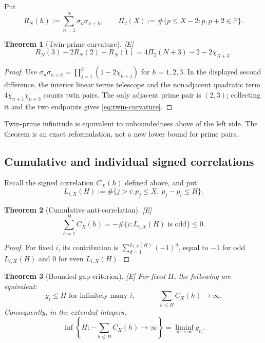 \documentclass[11pt]{article}
\newtheorem{theorem}{Theorem}[section]
\theoremstyle{definition}
\theoremstyle{remark}
\newcommand{\PP}{\mathbb P}
\newcommand{\status}[1]{\textnormal{\textcolor{accent}{\footnotesize[#1]}}}
\begin{document}
Put
\[
 R_N(h):=\sum_{n=1}^{N}\sigma_n\sigma_{n+h},
 \qquad
 \Pi_2(X):=\#\{p\le X-2:p,p+2\in\PP\}.
\]

\begin{theorem}[Twin-prime curvature]\label{thm:twin-curvature}
\status{E}
\begin{equation}\label{eq:twin-curvature}
 R_N(3)-2R_N(2)+R_N(1)
 =4\Pi_2(N+3)-2-2\chi_{N+3}.
\end{equation}
\end{theorem}

\begin{proof}
Use
$\sigma_n\sigma_{n+h}=\prod_{j=1}^{h}(1-2\chi_{n+j})$ for $h=1,2,3$.
In the displayed second difference, the interior linear terms telescope and the
nonadjacent quadratic term $4\chi_{n+1}\chi_{n+3}$ counts twin pairs.  The only adjacent
prime pair is $(2,3)$; collecting it and the two endpoints gives
\eqref{eq:twin-curvature}.
\end{proof}

Twin-prime infinitude is equivalent to unboundedness above of the left side.  The theorem
is an exact reformulation, not a new lower bound for prime pairs.

\subsection{Cumulative and individual signed correlations}

Recall the signed correlation $C_X(h)$ defined above, and put
\[
 L_{i,X}(H):=\#\{j>i:p_j\le X,\ p_j-p_i\le H\}.
\]

\begin{theorem}[Cumulative anti-correlation]\label{thm:cumulative-anti}
\status{E}
\begin{equation}\label{eq:cumulative-anti}
 \sum_{h=1}^{H}C_X(h)
 =-\#\{i:L_{i,X}(H)\text{ is odd}\}\le0.
\end{equation}
\end{theorem}

\begin{proof}
For fixed $i$, its contribution is
$\sum_{d=1}^{L_{i,X}(H)}(-1)^d$, equal to $-1$ for odd $L_{i,X}(H)$ and $0$ for even
$L_{i,X}(H)$.
\end{proof}

\begin{theorem}[Bounded-gap criterion]\label{thm:bounded-gap-criterion}
\status{E}
For fixed $H$, the following are equivalent:
\[
 g_i\le H\text{ for infinitely many }i,
 \qquad
 -\sum_{h\le H}C_X(h)\longrightarrow\infty.
\]
Consequently, in the extended integers,
\begin{equation}\label{eq:Hanti}
 \inf\left\{H:-\sum_{h\le H}C_X(h)\to\infty\right\}
 =\liminf_{n\to\infty}g_n.
\end{equation}
\end{theorem}
\end{document}
